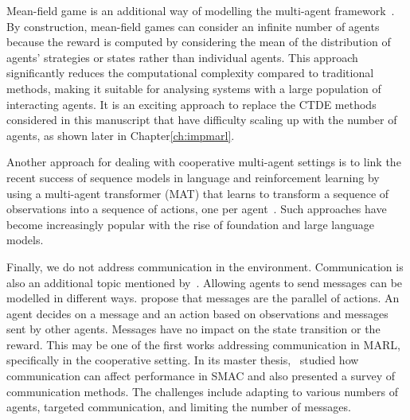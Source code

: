 Mean-field game is an additional way of modelling the multi-agent framework~\citep{lauriere2022learning}.
By construction, mean-field games can consider an infinite number of agents because the reward is computed by considering the mean of the distribution of agents' strategies or states rather than individual agents.
This approach significantly reduces the computational complexity compared to traditional methods, making it suitable for analysing systems with a large population of interacting agents.
It is an exciting approach to replace the CTDE methods considered in this manuscript that have difficulty scaling up with the number of agents, as shown later in Chapter\ref{ch:impmarl}.

Another approach for dealing with cooperative multi-agent settings is to link the recent success of sequence models in language and reinforcement learning by using a multi-agent transformer (MAT) that learns to transform a sequence of observations into a sequence of actions, one per agent~\citep{wen2022multiagent}.
Such approaches have become increasingly popular with the rise of foundation and large language models.

Finally, we do not address communication in the environment.
Communication is also an additional topic mentioned by~\citep{DecPomdp}.
Allowing agents to send messages can be modelled in different ways.
\cite{foerster2016learning} propose that messages are the parallel of actions.
An agent decides on a message and an action based on observations and messages sent by other agents.
Messages have no impact on the state transition or the reward.
This may be one of the first works addressing communication in MARL, specifically in the cooperative setting.
In its master thesis,~\cite{fombellida2020master} studied how communication can affect performance in SMAC and also presented a survey of communication methods.
The challenges include adapting to various numbers of agents, targeted communication, and limiting the number of messages.
